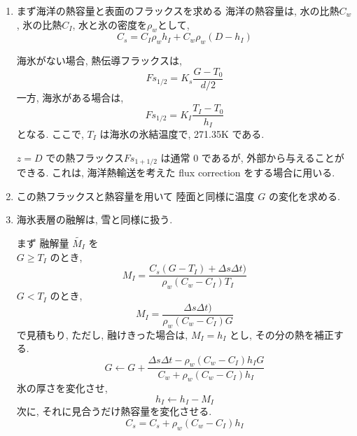 \begin{enumerate}
\item  まず海洋の熱容量と表面のフラックスを求める
海洋の熱容量は,
水の比熱$C_w$, 氷の比熱$C_I$, 水と氷の密度を$\rho_w$として,
\begin{equation}
  C_s  = C_I \rho_w h_I +   C_w \rho_w (D - h_I)
\end{equation}

海氷がない場合, 熱伝導フラックスは,
\begin{equation}
  Fs_{1/2} = K_s \frac{ G - T_0 }{d/2}
\end{equation}
一方, 海氷がある場合は,
\begin{equation}
 Fs_{1/2} = K_I \frac{ T_I - T_0 }{h_I}
\end{equation}
となる. ここで, $T_I$ は海氷の氷結温度で, 271.35K である.

$z=D$ での熱フラックス$Fs_{1+1/2}$ は通常 0 であるが,
外部から与えることができる.
これは, 海洋熱輸送を考えた flux correction をする場合に用いる.

\item この熱フラックスと熱容量を用いて
      陸面と同様に温度 $G$ の変化を求める.

\item 海氷表層の融解は, 雪と同様に扱う.

まず 融解量 $\tilde{M_I}$ を  \\
$G \ge T_I$ のとき, 
\begin{equation}
  M_I
  =  \frac{C_s ( G - T_I ) + \Delta s \Delta t )}
          {\rho_w ( C_w - C_I ) T_I }
\end{equation}
$G < T_I$ のとき, 
\begin{equation}
  M_I
  =  \frac{\Delta s \Delta t )}
          {\rho_w ( C_w - C_I ) G}
\end{equation}
で見積もり,
ただし, 融けきった場合は, $M_I=h_I$ とし, その分の熱を補正する.
\begin{equation}
  G \leftarrow G + \frac{ \Delta s \Delta t 
                          - \rho_w ( C_w - C_I ) h_I G  }
                        { C_w + \rho_w ( C_w - C_I ) h_I}
\end{equation}
氷の厚さを変化させ,
\begin{equation}
  h_I \leftarrow h_I - M_I 
\end{equation}
次に, それに見合うだけ熱容量を変化させる.
\begin{equation}
  C_s = C_s + \rho_w ( C_w - C_I ) h_I
\end{equation}


\end{enumerate}
